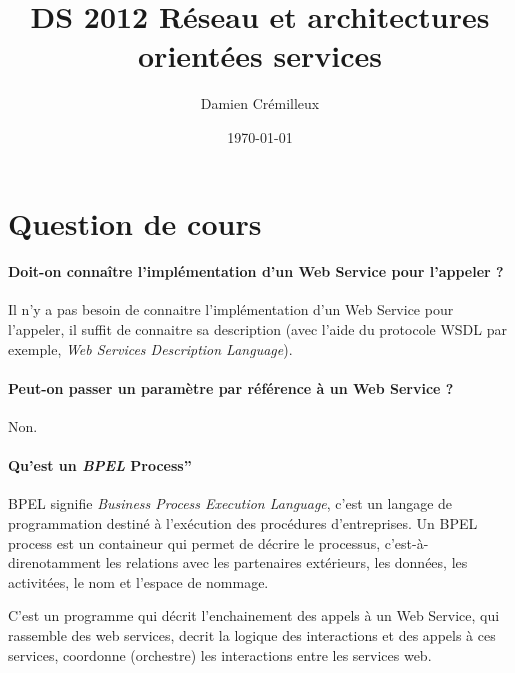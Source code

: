 \documentclass[a4paper]{article}
\begin{document}
\title{DS 2012 Réseau et architectures orientées services}
\author{Damien Crémilleux}
\date{\today}
\maketitle


\section{Question de cours}

\paragraph{Doit-on connaître l'implémentation d'un Web Service pour l'appeler ?}
Il n'y a pas besoin de connaitre l'implémentation d'un Web Service pour l'appeler, il suffit de connaitre sa description (avec l'aide du protocole WSDL par exemple, \textit{Web Services Description Language}).

\paragraph{Peut-on passer un paramètre par référence à un Web Service ?}
Non.

\paragraph{Qu'est un \textit{BPEL} Process''}
BPEL signifie \textit{Business Process Execution Language}, c'est un langage de programmation destiné à l'exécution des procédures d'entreprises. Un BPEL process est un containeur qui permet de décrire le processus, c'est-à-direnotamment les relations avec les partenaires extérieurs, les données, les activitées, le nom et l'espace de nommage.

C'est un programme qui décrit l'enchainement des appels à un Web Service, qui rassemble des web services, decrit la logique des interactions et des appels à ces services, coordonne (orchestre) les interactions entre les services web.
\end{document}
